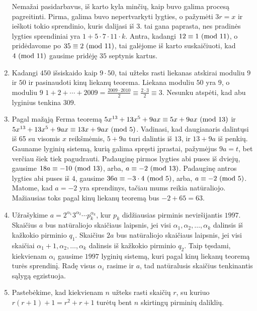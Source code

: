 \begin{enumerate}
    Nemažai pasidarbavus, iš karto kyla minčių, kaip buvo galima procesą
    pagreitinti. Pirma, galima buvo nepertvarkyti lygties, o pažymėti
    $3r = x$ ir ieškoti tokio sprendinio, kuris dalijasi iš $3$. tai gana
    paprasta, nes pradinės lygties sprendiniai yra $1 + 5 \cdot 7 \cdot 11 \cdot
    k$. Antra, kadangi $12 \equiv 1 \ (\text{mod } 11)$, o pridėdavome po $35\equiv
    2\ (\text{mod } 11)$, tai galėjome iš karto suskaičiuoti, kad $4 \ (\text{mod } 11)$ gausime pridėję
    $35$ septynis kartus. 
\item
    Kadangi $450$ išsiskaido kaip $9\cdot 50$, tai užteks rasti liekanas
    atskirai moduliu $9$ ir $50$ ir pasinaudoti kinų liekanų teorema.
    Liekana moduliu $50$ yra $9$, o moduliu $9$ 
    $1+2+\cdots+2009=\frac{2009\cdot2010}{2} \equiv \frac{2\cdot
    3}{2} \equiv 3$. Nesunku atspėti, kad abu lyginius tenkina $309$.
\item
    Pagal mažąją Ferma teoremą $5x^{13} + 13 x^5 +9ax \equiv 5x + 9ax
    \ (\text{mod } 13)$ ir $5x^{13} + 13 x^5 +9ax \equiv 13x + 9ax \ (\text{mod } 5)$. Vadinasi,
    kad daugianaris dalintųsi iš 65 su visomis $x$ reikšmėmis, $5+9a$ turi
    dalintis iš $13$, ir $13+9a$ iš penkių. Gauname lyginių sistemą, kurią
    galima spręsti įprastai, pažymėjus $9a=t$, bet verčiau šiek tiek
    pagudrauti. Padauginę pirmos lygties abi puses iš dviejų, gausime
    $18a \equiv -10 \ (\text{mod } 13)$, arba, $a \equiv -2 \ (\text{mod } 13)$. Padauginę antros
    lygties abi puses iš $4$, gausime $36a \equiv -3\cdot 4\ (\text{mod } 5)$, arba,
    $a \equiv -2\ (\text{mod } 5)$. Matome, kad $a=-2$ yra sprendinys, tačiau mums
    reikia natūraliojo. Mažiausias toks pagal kinų liekanų teoremą bus
    $-2+65 = 63$.
\item
    Užrašykime $a = 2^{\alpha_1}3^{\alpha_2} \cdots p_k^{\alpha_k}$, kur
    $p_k$ didžiausias pirminis neviršijantis $1997$.
    Skaičius $a$ bus natūraliojo skaičiaus laipsnis, jei visi $\alpha_1,
    \alpha_2, \dots, \alpha_k$ dalinsis iš kažkokio pirminio $q_1$.
    Skaičius $2a$ bus natūraliojo skaičiaus laipsnis, jei visi skaičiai
    $\alpha_1 +1, \alpha_2, \dots, \alpha_k$ dalinsis iš kažkokio pirminio
    $q_2$. Taip tęsdami, kiekvienam $\alpha_i$ gausime $1997$ lyginių
    sistemą, kuri pagal kinų liekanų teoremą turės sprendinį. Radę visus
    $\alpha_i$ rasime ir $a$, tad natūralusis skaičius tenkinantis sąlygą
    egzistuoja.
\item
    Pastebėkime, kad kiekvienam $n$ užteks rasti skaičių $r$, su kuriuo
    $r(r+1)+1=r^2 + r + 1$ turėtų bent $n$ skirtingų pirminių daliklių. 
    

\end{enumerate}
